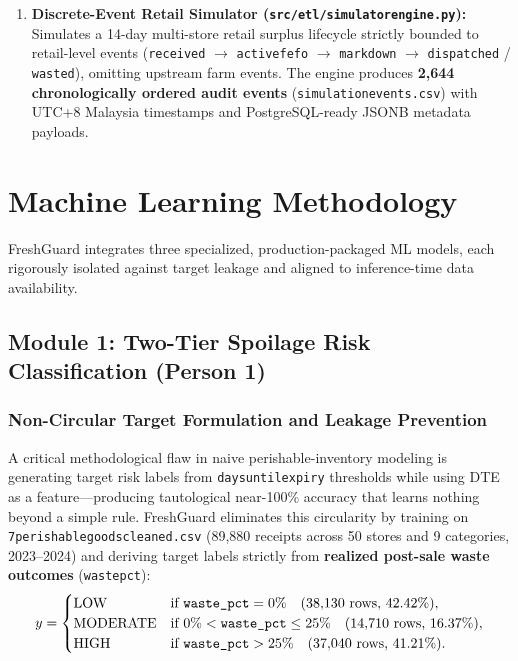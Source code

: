 \documentclass[11pt,a4paper]{article}
\renewcommand{\_}{\oldunderscore\allowbreak}
\begin{document}
\begin{enumerate}[leftmargin=18pt, itemsep=3pt]
    \item \textbf{Discrete-Event Retail Simulator (\texttt{src/etl/simulator\_engine.py}):} Simulates a 14-day multi-store retail surplus lifecycle strictly bounded to retail-level events (\texttt{received} $\to$ \texttt{active\_fefo} $\to$ \texttt{markdown} $\to$ \texttt{dispatched} / \texttt{wasted}), omitting upstream farm events. The engine produces \textbf{2,644 chronologically ordered audit events} (\texttt{simulation\_events.csv}) with UTC+8 Malaysia timestamps and PostgreSQL-ready JSONB metadata payloads.
\end{enumerate}

\section{Machine Learning Methodology}

FreshGuard integrates three specialized, production-packaged ML models, each rigorously isolated against target leakage and aligned to inference-time data availability.

\subsection{Module 1: Two-Tier Spoilage Risk Classification (Person 1)}
\label{sec:spoilage_method}

\subsubsection{Non-Circular Target Formulation and Leakage Prevention}
A critical methodological flaw in naive perishable-inventory modeling is generating target risk labels from \texttt{days\_until\_expiry} thresholds while using DTE as a feature---producing tautological near-100\% accuracy that learns nothing beyond a simple rule. FreshGuard eliminates this circularity by training on \texttt{7\_perishable\_goods\_cleaned.csv} (89,880 receipts across 50 stores and 9 categories, 2023--2024) and deriving target labels strictly from \textbf{realized post-sale waste outcomes} (\texttt{waste\_pct}):
\begin{equation}
    y = \begin{cases}
        \text{LOW}      & \text{if } \texttt{waste\_pct} = 0\% \quad (38{,}130\text{ rows, } 42.42\%), \\
        \text{MODERATE} & \text{if } 0\% < \texttt{waste\_pct} \le 25\% \quad (14{,}710\text{ rows, } 16.37\%), \\
        \text{HIGH}     & \text{if } \texttt{waste\_pct} > 25\% \quad (37{,}040\text{ rows, } 41.21\%).
    \end{cases}
\end{equation}
\end{document}
